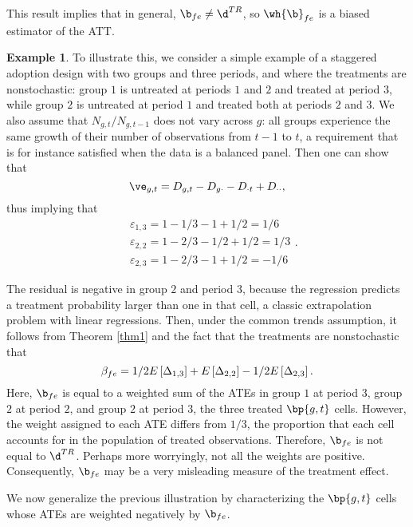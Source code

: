 \documentclass[12pt]{article}
\theoremstyle{definition}
\newtheorem{example}{Example}
\begin{document}
This result implies that in general, $\b_{fe} \neq \d^{TR}$, so $\wh{\b}_{fe}$ is a biased estimator of the ATT. 

\begin{example}
    To illustrate this, we consider a simple example of a staggered adoption design with two groups and three periods, and where the treatments are nonstochastic: group $1$ is untreated at periods $1$ and $2$ and treated at period $3$, while group $2$ is untreated at period $1$ and treated both at periods $2$ and $3$. We also assume that $N_{g,t} / N_{g,t-1}$ does not vary across $g$: all groups experience the same growth of their number of observations from $t-1$ to $t$, a requirement that is for instance satisfied when the data is a balanced panel. Then one can show that 
    $$
    \ve_{g,t} = D_{g,t} - D_{g\cdot} - D_{\cdot t} + D_{\cdot\cdot},
    $$
    thus implying that 
    $$
    \begin{aligned}
    & \varepsilon_{1,3}=1-1 / 3-1+1 / 2=1 / 6 \\
    & \varepsilon_{2,2}=1-2 / 3-1 / 2+1 / 2=1 / 3 \\
    & \varepsilon_{2,3}=1-2 / 3-1+1 / 2=-1 / 6 
    \end{aligned}.
    $$
    
    The residual is negative in group $2$ and period $3$, because the regression predicts a treatment probability larger than one in that cell, a classic extrapolation problem with linear regressions. Then, under the common trends assumption, it follows from Theorem \ref{thm1} and the fact that the treatments are nonstochastic that 
    \begin{equation}
        \notag 
        \beta_{f e}=1 / 2 E\left[\Delta_{1,3}\right]+E\left[\Delta_{2,2}\right]-1 / 2 E\left[\Delta_{2,3}\right].
    \end{equation}
    Here, $\b_{fe}$ is equal to a weighted sum of the ATEs in group $1$ at period $3$, group $2$ at period $2$, and group $2$ at period $3$, the three treated $\bp{g,t}$ cells. However, the weight assigned to each ATE differs from $1/3$, the proportion that each cell accounts for in the population of treated observations. Therefore, $\b_{fe}$ is not equal to $\d^{TR}$. Perhaps more worryingly, not all the weights are positive. Consequently, $\b_{fe}$ may be a very misleading measure of the treatment effect.
\end{example}

We now generalize the previous illustration by characterizing the $\bp{g,t}$ cells whose ATEs are weighted negatively by $\b_{fe}$.
\end{document}
